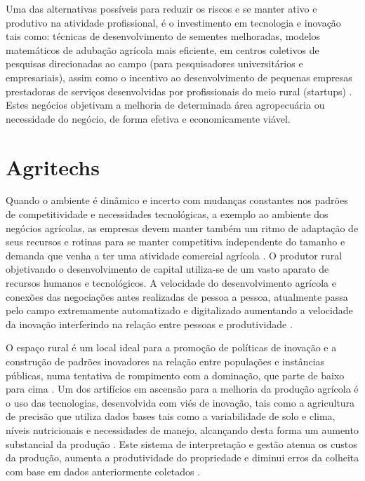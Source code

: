 Uma das alternativas possíveis para reduzir os riscos e se manter ativo e produtivo na atividade profissional, é o investimento em tecnologia e inovação tais como: técnicas de desenvolvimento de sementes melhoradas, modelos matemáticos de adubação agrícola mais eficiente, em centros coletivos de pesquisas direcionadas ao campo (para pesquisadores universitários e empresariais), assim como o incentivo ao desenvolvimento de pequenas empresas prestadoras de serviços desenvolvidas por profissionais do meio rural (startups) \cite{bochi_dorneles_coletivos_2014, gomes_inovacao_2014}.
Estes negócios objetivam a melhoria de determinada área agropecuária \cite{volpato_agtechs_2019} ou necessidade do negócio, de forma efetiva e economicamente viável. 

\section{Agritechs}

Quando o ambiente é dinâmico e incerto  com mudanças constantes nos padrões de competitividade e necessidades tecnológicas, a exemplo ao ambiente dos negócios agrícolas, as empresas devem manter também um ritmo de adaptação de seus recursos e rotinas para se manter competitiva independente do tamanho e demanda que venha a ter uma atividade comercial agrícola \cite{fitz-koch_reciprocal_2017}. O produtor rural objetivando o desenvolvimento de capital utiliza-se de um vasto aparato de recursos humanos e tecnológicos. A velocidade do desenvolvimento agrícola e conexões das negociações antes realizadas de pessoa a pessoa, atualmente passa pelo campo extremamente automatizado e digitalizado aumentando a velocidade da inovação interferindo na relação entre pessoas e produtividade \cite{campos_o_2016}. 


O espaço rural é um local ideal para a promoção de políticas de inovação e a construção de padrões inovadores na relação entre populações e instâncias públicas, numa tentativa de rompimento com a dominação, que parte de baixo para cima \cite{magruder_assessment_2018}. Um dos artifícios em ascensão para a melhoria da produção agrícola é o uso das tecnologias, desenvolvida com viés de inovação, tais como a agricultura de precisão que utiliza dados bases tais como a variabilidade de solo e clima, níveis nutricionais e necessidades de manejo, alcançando desta forma um aumento substancial da produção \cite{barnes_exploring_2019}. Este sistema de interpretação e gestão atenua os custos da produção, aumenta a produtividade do propriedade e diminui erros da colheita com base em dados anteriormente coletados \cite{barnes_influencing_2018}.


